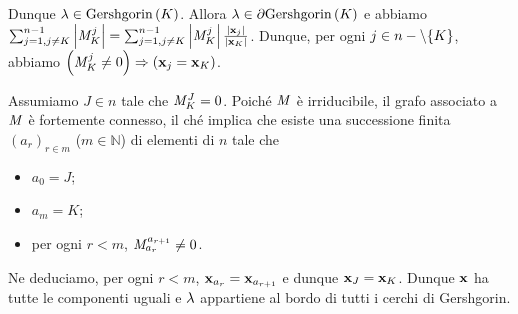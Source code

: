 Dunque $\Eigenvalue \in \GershgorinDisk{K}$.
Allora $\Eigenvalue \in \Boundary\GershgorinDisk{K}$ e abbiamo
$\sum_{j = 1,\\j \neq K}^{n - 1} \AbsoluteValue{\Matrix_K^j}
= \sum_{j = 1,\\j \neq K}^{n - 1} \AbsoluteValue{\Matrix_K^j}
\frac{\AbsoluteValue{\Eigenvector_j}}{\AbsoluteValue{\Eigenvector_K}}$.
Dunque, per ogni $j \in n - \setminus \lbrace K \rbrace$, abbiamo
$\Implies{\Matrix_K^j \neq 0}{\Eigenvector_j = \Eigenvector_K}$.
\par Assumiamo $J \in n$ tale che $\mathit{M}_K^J = 0$. Poich\'e $\mathit{M}$ \`e
irriducibile, il grafo associato a $\mathit{M}$ \`e fortemente connesso, il
ch\'e implica che esiste una successione finita $(a_r)_{r \in m}$
($m \in \mathbb{N}$) di elementi di $n$ tale che
	\begin{itemize}
		\item $a_0 = J$;
		\item $a_m = K$;
		\item per ogni $r < m$, $\mathit{M}_{a_r}^{a_{r + 1}} \neq 0$.
	\end{itemize}
Ne deduciamo, per ogni $r < m$,
$\Eigenvector_{a_r} = \Eigenvector_{a_{r + 1}}$ e dunque
$\Eigenvector_J = \Eigenvector_K$. Dunque $\Eigenvector$ ha tutte le
componenti uguali e $\lambda$ appartiene al bordo di tutti i cerchi di
Gershgorin. \EndProof
